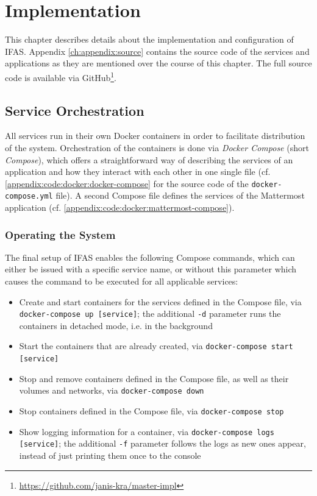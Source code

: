 %
\chapter{Implementation}
\label{ch:implementation}

This chapter describes details about the implementation and configuration of \acf{IFAS}.
Appendix \cref{ch:appendix:source} contains the source code of the services and applications as they are mentioned over the course of this chapter.
The full source code is available via GitHub\footnote{\url{https://github.com/janis-kra/master-impl}}.

\section{Service Orchestration}
\label{sec:implementation:orchestration}

All services run in their own Docker containers in order to facilitate distribution of the system.
Orchestration of the containers is done via \emph{Docker Compose} (short \emph{Compose}), which offers a straightforward way of describing the services of an application and how they interact with each other in one single file (cf. \cref{appendix:code:docker:docker-compose} for the source code of the \texttt{docker-compose.yml} file).
A second Compose file defines the services of the Mattermost application (cf. \cref{appendix:code:docker:mattermost-compose}).

\subsection{Operating the System}

The final setup of \ac{IFAS} enables the following Compose commands, which can either be issued with a specific service name, or without this parameter which causes the command to be executed for all applicable services:

\begin{itemize}
\item Create and start containers for the services defined in the Compose file, via \texttt{docker-compose up [service]}; the additional \texttt{-d} parameter runs the containers in detached mode, i.e. in the background
\item Start the containers that are already created, via \texttt{docker-compose start [service]}
\item Stop and remove containers defined in the Compose file, as well as their volumes and networks, via \texttt{docker-compose down}
\item Stop containers defined in the Compose file, via \texttt{docker-compose stop}
\item Show logging information for a container, via \texttt{docker-compose logs [service]}; the additional \texttt{-f} parameter follows the logs as new ones appear, instead of just printing them once to the  console
\end{itemize}

